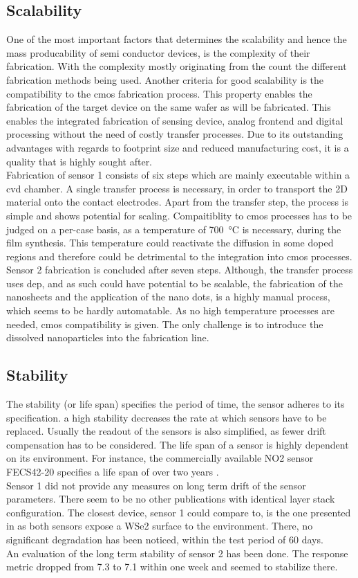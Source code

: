{\subsection{Scalability}
One of the most important factors that determines the scalability and hence the mass producability of semi conductor devices, is the complexity of their fabrication. With the complexity mostly originating from the count the different fabrication methods being used. Another criteria for good scalability is the compatibility to the \gls{cmos} fabrication process. This property enables the fabrication of the target device on the same wafer as  will be fabricated. This enables the integrated fabrication of sensing device, analog frontend and digital processing without the need of costly transfer processes. Due to its outstanding advantages with regards to footprint size and reduced manufacturing cost, it is a quality that is highly sought after.\\
Fabrication of sensor 1 consists of six steps which are mainly executable within a \gls{cvd} chamber. A single transfer process is necessary, in order to transport the 2D material onto the contact electrodes. Apart from the transfer step, the process is simple and shows potential for scaling. Compaitiblity to \gls{cmos} processes has to be judged on a per-case basis, as a temperature of \SI{700}{\celsius} is necessary, during the film synthesis. This temperature could reactivate the diffusion in some doped regions and therefore could be detrimental to the integration into \gls{cmos} processes.\\
Sensor 2 fabrication is concluded after seven steps. Although, the transfer process uses \gls{dep}, and as such could have potential to be scalable, the fabrication of the nanosheets and the application of the nano dots, is a highly manual process, which seems to be hardly automatable. As no high temperature processes are needed, \gls{cmos} compatibility is given. The only challenge is to introduce the dissolved nanoparticles into the fabrication line.
\subsection{Stability}
The stability (or life span) specifies the period of time, the sensor adheres to its specification. a high stability decreases the rate at which sensors have to be replaced. Usually the readout of the sensors is also simplified, as fewer drift compensation has to be considered. The life span of a sensor is highly dependent on its environment. For instance, the commercially available NO2 sensor FECS42-20 specifies a life span of over two years \cite{Figaro}. \\ 
Sensor 1 did not provide any measures on long term drift of the sensor parameters. There seem to be no other publications with identical layer stack configuration. The closest device, sensor 1 could compare to, is the one presented in \cite{Wu2020} as both sensors expose a WSe2 surface to the environment. There, no significant degradation has been noticed, within the test period of 60 days. \\
An evaluation of the long term stability of sensor 2 has been done. The response metric dropped from 7.3 to 7.1 within one week and seemed to stabilize there.
}